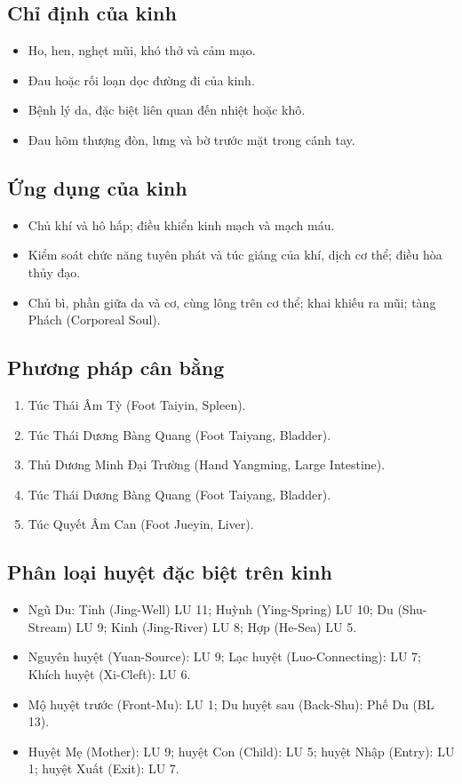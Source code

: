 \documentclass[12pt,a4paper]{article}
\begin{document}
\subsection*{Chỉ định của kinh}
\begin{itemize}
  \item Ho, hen, nghẹt mũi, khó thở và cảm mạo.
  \item Đau hoặc rối loạn dọc đường đi của kinh.
  \item Bệnh lý da, đặc biệt liên quan đến nhiệt hoặc khô.
  \item Đau hõm thượng đòn, lưng và bờ trước mặt trong cánh tay.
\end{itemize}

\subsection*{Ứng dụng của kinh}
\begin{itemize}
  \item Chủ khí và hô hấp; điều khiển kinh mạch và mạch máu.
  \item Kiểm soát chức năng tuyên phát và túc giáng của khí, dịch cơ thể; điều hòa thủy đạo.
  \item Chủ bì, phần giữa da và cơ, cùng lông trên cơ thể; khai khiếu ra mũi; tàng Phách (Corporeal Soul).
\end{itemize}

\subsection*{Phương pháp cân bằng}
\begin{enumerate}
  \item Túc Thái Âm Tỳ (Foot Taiyin, Spleen).
  \item Túc Thái Dương Bàng Quang (Foot Taiyang, Bladder).
  \item Thủ Dương Minh Đại Trường (Hand Yangming, Large Intestine).
  \item Túc Thái Dương Bàng Quang (Foot Taiyang, Bladder).
  \item Túc Quyết Âm Can (Foot Jueyin, Liver).
\end{enumerate}

\subsection*{Phân loại huyệt đặc biệt trên kinh}
\begin{itemize}
  \item Ngũ Du: Tỉnh (Jing-Well) LU 11; Huỳnh (Ying-Spring) LU 10; Du (Shu-Stream) LU 9; Kinh (Jing-River) LU 8; Hợp (He-Sea) LU 5.
  \item Nguyên huyệt (Yuan-Source): LU 9; Lạc huyệt (Luo-Connecting): LU 7; Khích huyệt (Xi-Cleft): LU 6.
  \item Mộ huyệt trước (Front-Mu): LU 1; Du huyệt sau (Back-Shu): Phế Du (BL 13).
  \item Huyệt Mẹ (Mother): LU 9; huyệt Con (Child): LU 5; huyệt Nhập (Entry): LU 1; huyệt Xuất (Exit): LU 7.
\end{itemize}
\end{document}
